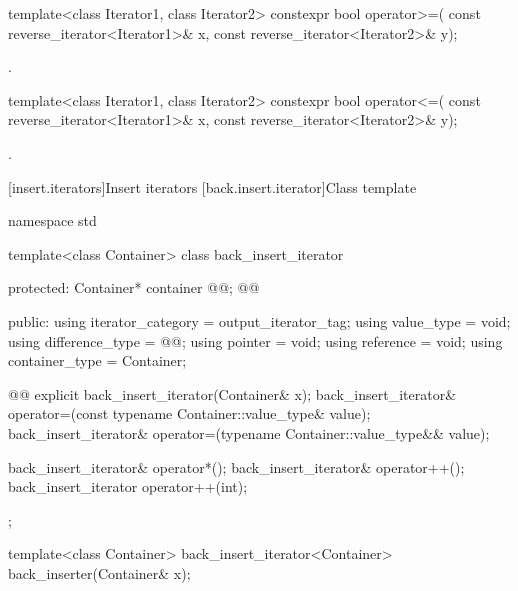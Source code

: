 %
\begin{itemdecl}
template<class Iterator1, class Iterator2>
  constexpr bool operator>=(
    const reverse_iterator<Iterator1>& x,
    const reverse_iterator<Iterator2>& y);
\end{itemdecl}

\begin{itemdescr}
\pnum
\returns
{}.
\end{itemdescr}

%
\begin{itemdecl}
template<class Iterator1, class Iterator2>
  constexpr bool operator<=(
    const reverse_iterator<Iterator1>& x,
    const reverse_iterator<Iterator2>& y);
\end{itemdecl}

\begin{itemdescr}
\pnum
\returns
{}.
\end{itemdescr}







[insert.iterators]{Insert iterators}
[back.insert.iterator]{Class template }


%
\begin{codeblock}
namespace std {
  template<class Container>
  class back_insert_iterator {
  protected:
    Container* container @@; @\added{// \expos}@

  public:
    using iterator_category = output_iterator_tag;
    using value_type        = void;
    using difference_type   = @@;
    using pointer           = void;
    using reference         = void;
    using container_type    = Container;

    @@
    explicit back_insert_iterator(Container& x);
    back_insert_iterator& operator=(const typename Container::value_type& value);
    back_insert_iterator& operator=(typename Container::value_type&& value);

    back_insert_iterator& operator*();
    back_insert_iterator& operator++();
    back_insert_iterator  operator++(int);
  };

  template<class Container>
    back_insert_iterator<Container> back_inserter(Container& x);
}
\end{codeblock}


